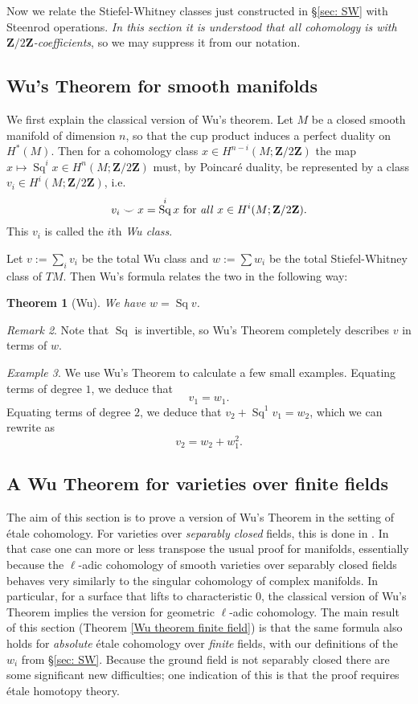 \documentclass[10pt, reqno]{amsart}
\numberwithin{equation}{subsection}
\newcommand{\Z}{\mathbf{Z}}
\DeclareMathOperator{\Sq}{Sq}
\newtheorem{thm}{Theorem}[section]
\theoremstyle{remark}
\newtheorem{remark}[thm]{Remark}
\newtheorem{example}[thm]{Example}
\begin{document}
Now we relate the Stiefel-Whitney classes just constructed in \S\ref{sec: SW} with Steenrod operations. \emph{In this section it is understood that all cohomology is with $\Z/2\Z$-coefficients}, so we may suppress it from our notation. 


\subsection{Wu's Theorem for smooth manifolds}

We first explain the classical version of Wu's theorem. Let $M$ be a closed smooth manifold of dimension $n$, so that the cup product induces a perfect duality on $H^*(M)$. Then for a cohomology class $x \in H^{n-i}(M; \Z/2\Z)$ the map $x \mapsto \Sq^i x \in H^n(M; \Z/2\Z)$ must, by Poincar\'{e} duality, be represented by a class $v_i \in H^i(M; \Z/2\Z)$, i.e.
\[
v_i \smile x  = \Sq^i x \text{ for \emph{all} }  x \in H^i(M; \Z/2\Z).
\]
This $v_i$ is called the $i$th \emph{Wu class}. 

Let $v := \sum_i v_i$ be the total Wu class and $w := \sum w_i$ be the total Stiefel-Whitney class of $TM$. Then Wu's formula relates the two in the following way:

\begin{thm}[Wu]
We have $w = \Sq v$. 
\end{thm} 


\begin{remark}
Note that $\Sq$ is invertible, so Wu's Theorem completely describes $v$ in terms of $w$. 
\end{remark}

\begin{example}\label{ex: wu classes}
We use Wu's Theorem to calculate a few small examples. Equating terms of degree $1$, we deduce that 
\[
v_1 =  w_1.
\]
Equating terms of degree $2$, we deduce that $v_2 + \Sq^1 v_1 = w_2$, which we can rewrite as 
\[
v_2 = w_2 + w_1^2.
\] 
\end{example}

\subsection{A Wu Theorem for varieties over finite fields}

The aim of this section is to prove a version of Wu's Theorem in the setting of \'{e}tale cohomology. For varieties over \emph{separably closed} fields, this is done in \cite[Theorem 0.5]{Urabe96}. In that case one can more or less transpose the usual proof for manifolds, essentially because the $\ell$-adic cohomology of smooth varieties over separably closed fields behaves very similarly to the singular cohomology of complex manifolds. In particular, for a surface that lifts to characteristic $0$, the classical version of Wu's Theorem implies the version for geometric $\ell$-adic cohomology. The main result of this section (Theorem \ref{Wu theorem finite field}) is that the same formula also holds for \emph{absolute} \'{e}tale cohomology over \emph{finite} fields, with our definitions of the $w_i$ from \S \ref{sec: SW}. Because the ground field is not separably closed there are some significant new difficulties; one indication of this is that the proof requires \'{e}tale homotopy theory.
\end{document}
